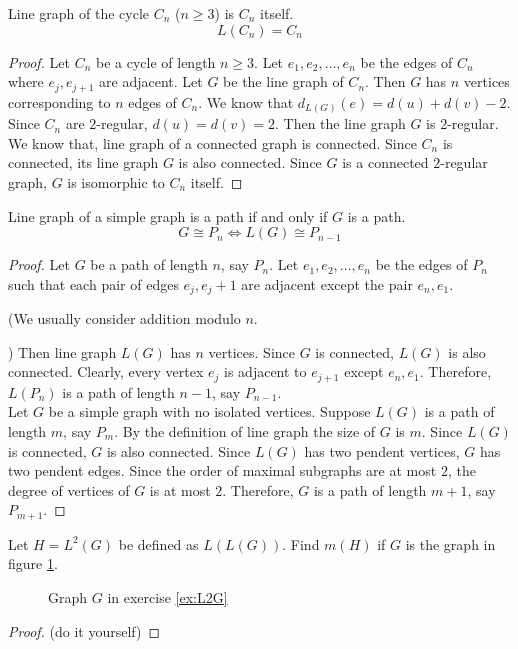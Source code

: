 \begin{exercise}
	Line graph of the cycle $C_n$ ($n \ge 3$) is $C_n$ itself.
	$$ L(C_n) = C_n$$
\end{exercise}
\begin{proof}
	Let $C_n$ be a cycle of length $n \ge 3$. Let $e_1,e_2,\dots,e_n$ be the edges of $C_n$ where $e_j,e_{j+1}$ are adjacent. Let $G$ be the line graph of $C_n$. Then $G$ has $n$ vertices corresponding to $n$ edges of $C_n$. We know that $d_{L(G)}(e) = d(u) + d(v) - 2$. Since $C_n$ are $2$-regular, $d(u) = d(v) = 2$. Then the line graph $G$ is $2$-regular. We know that, line graph of a connected graph is connected. Since $C_n$ is connected, its line graph $G$ is also connected. Since $G$ is a connected $2$-regular graph, $G$ is isomorphic to $C_n$ itself.
\end{proof}

\begin{theorem}
	Line graph of a simple graph is a path if and only if $G$ is a path.
	$$ G \cong P_n \iff L(G) \cong P_{n-1} $$
\end{theorem}
\begin{proof}
	Let $G$ be a path of length $n$, say $P_n$. Let $e_1,e_2,\dots,e_n$ be the edges of $P_n$ such that each pair of edges $e_j,e_j+1$ are adjacent except the pair $e_n,e_1$.
	\begin{commentary} (We usually consider addition modulo $n$.\end{commentary}) Then line graph $L(G)$ has $n$ vertices. Since $G$ is connected, $L(G)$ is also connected. Clearly, every vertex $e_j$ is adjacent to $e_{j+1}$ except $e_n,e_1$. Therefore, $L(P_n)$ is a path of length $n-1$, say $P_{n-1}$.\\

		Let $G$ be a simple graph with no isolated vertices. Suppose $L(G)$ is a path of length $m$, say $P_m$. By the definition of line graph the size of $G$ is $m$. Since $L(G)$ is connected, $G$ is also connected. Since $L(G)$ has two pendent vertices, $G$ has two pendent edges. Since the order of maximal subgraphs are at most $2$, the degree of vertices of $G$ is at most $2$. Therefore, $G$ is a path of length $m+1$, say $P_{m+1}$.
\end{proof}

\begin{exercise}
	\label{ex:L2G}
	Let $H = L^2(G)$ be defined as $L(L(G))$. Find $m(H)$ if $G$ is the graph in figure \ref{dia:L2G}.
\begin{figure}[hbt]
\centering
{}
	\caption{Graph $G$ in exercise \ref{ex:L2G} }
	\label{dia:L2G}
\end{figure}
\end{exercise}
\begin{proof}
	(do it yourself)
\end{proof}

